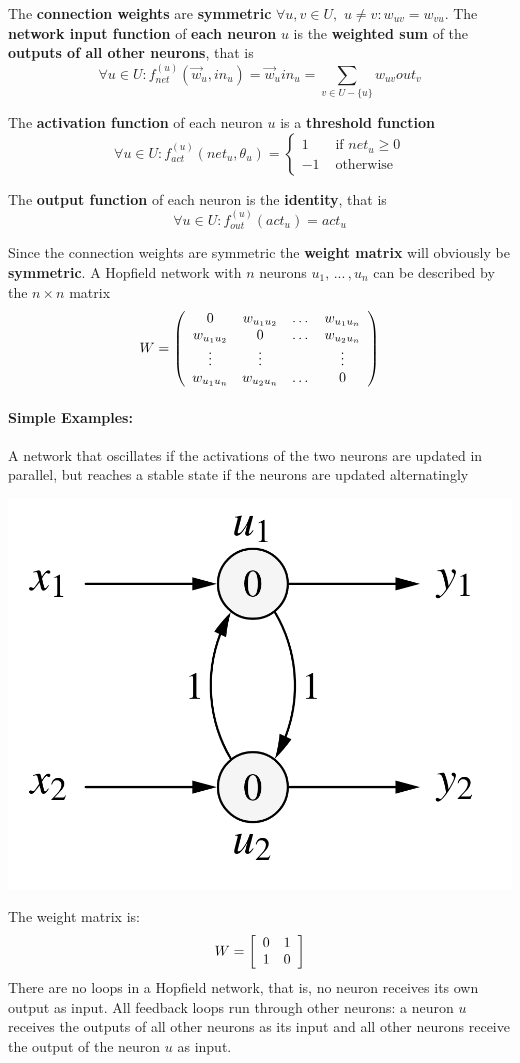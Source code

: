 \documentclass[11pt]{article}
\begin{document}
		The \textbf{connection weights} are \textbf{symmetric} $\forall u, v \in U,$ $u \neq v: w_{uv} = w_{vu}$. The \textbf{network input function} of \textbf{each neuron} $u$ is the \textbf{weighted sum} of the \textbf{outputs of all other neurons}, that is
		$$ \forall u \in U: f_{net}^{(u)} (\vec{w}_u, in_{u}) = \vec{w}_u in_u = \sum_{v \in U - \{u\}} w_{uv} out_v $$
		
		The \textbf{activation function} of each neuron $u$ is a \textbf{threshold function}
		$$ \forall u \in U: f^{(u)}_{act} (net_u, \theta_u) =
		\begin{cases}
			1 & \text{ if } net_u \geq 0 \\
			-1 & \text{ otherwise}
		\end{cases}
		$$
		
		The \textbf{output function} of each neuron is the \textbf{identity}, that is
		$$ \forall u \in U: f_{out}^{(u)} (act_u) = act_u $$
		
		Since the connection weights are symmetric the \textbf{weight matrix} will obviously be \textbf{symmetric}. A Hopfield network with $n$ neurons $u_1, \, ... \, , u_n$ can be described by the $n \times n$ matrix
		$$ 
		W = \left(
		\begin{array}{c c c c}
			0 & w_{u_1u_2} & \dots & w_{u_1u_n}\\
			w_{u_1u_2} & 0 & \dots & w_{u_2u_n} \\
			\vdots & \vdots & & \vdots \\
			w_{u_1u_n} & w_{u_2u_n} & \dots & 0 
		\end{array}
		\right)
		$$
		
		\newpage
		
		\paragraph{Simple Examples:} A network that oscillates if the activations of the two neurons are updated in parallel, but reaches a stable state if the neurons are updated alternatingly
		\begin{center}
			\includegraphics[width=0.45\columnwidth]{img/NN/HN1}
		\end{center}
		The weight matrix is: 
		$$ W = \left[
		\begin{array}{c c}
			0 & 1 \\
			1 & 0
		\end{array}
		\right]
		$$
		There are no loops in a Hopfield network, that is, no neuron receives its own output as input. All feedback loops run through other neurons: a neuron $u$ receives the outputs of all other neurons as its input and all other neurons receive the output of the neuron $u$ as input. \\
		
\end{document}
